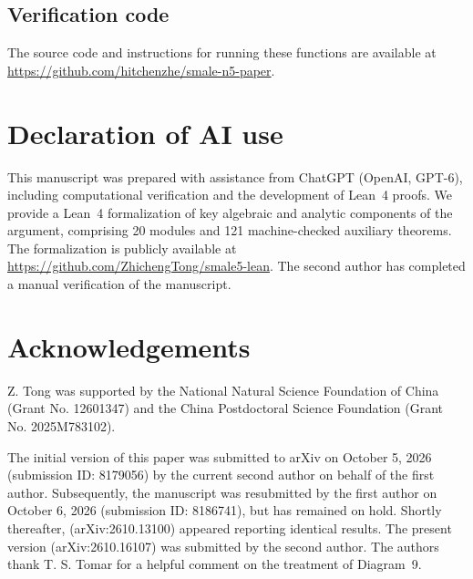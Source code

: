 \documentclass[Threeside,11pt]{article}
\theoremstyle{definition}
\theoremstyle{remark}
\numberwithin{equation}{section}
\theoremstyle{remark}
\begin{document}
\subsection*{Verification code}
\label{app:public-verification-source}
The source code and instructions for running these functions are available at
\url{https://github.com/hitchenzhe/smale-n5-paper}.

\section*{Declaration of AI use}
This manuscript was prepared with assistance from ChatGPT (OpenAI, GPT-6),
including computational verification and the development of Lean~4 proofs.
We provide a Lean~4 formalization of key algebraic and analytic components
of the argument, comprising 20 modules and 121 machine-checked auxiliary
theorems. The formalization is publicly available at
\url{https://github.com/ZhichengTong/smale5-lean}.
The second author has completed a manual verification of the manuscript.

\section*{Acknowledgements}
Z. Tong was supported by the National Natural Science Foundation of China
(Grant No. 12601347) and the China Postdoctoral Science Foundation
(Grant No. 2025M783102).


The initial version of this paper was submitted to arXiv on October 5, 2026 (submission ID: 8179056) by the current second author on behalf of the first author. Subsequently, the manuscript was resubmitted by the first author on October 6, 2026 (submission ID: 8186741), but has remained on hold. Shortly thereafter, \cite{FiveT} (arXiv:2610.13100) appeared reporting identical results. The present version (arXiv:2610.16107) was submitted by the second author. The authors thank T. S. Tomar for a helpful comment on the treatment of Diagram~9.
\end{document}
